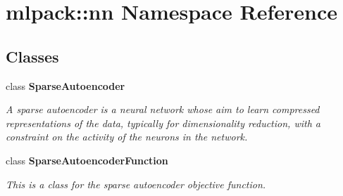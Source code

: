 \section{mlpack\-:\-:nn Namespace Reference}
\label{namespacemlpack_1_1nn}
\subsection*{Classes}
\begin{DoxyCompactItemize}
\item 
class {\bf Sparse\-Autoencoder}
\begin{DoxyCompactList}\small\item\em A sparse autoencoder is a neural network whose aim to learn compressed representations of the data, typically for dimensionality reduction, with a constraint on the activity of the neurons in the network. \end{DoxyCompactList}\item 
class {\bf Sparse\-Autoencoder\-Function}
\begin{DoxyCompactList}\small\item\em This is a class for the sparse autoencoder objective function. \end{DoxyCompactList}\end{DoxyCompactItemize}
